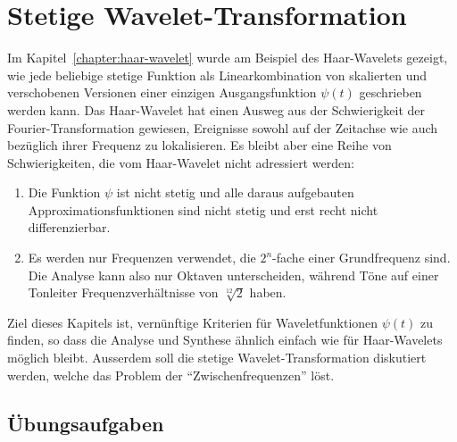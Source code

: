 %
%
%
\chapter{Stetige Wavelet-Transformation
\label{chapter:cwt}}
Im Kapitel~\ref{chapter:haar-wavelet} wurde am Beispiel des Haar-Wavelets
gezeigt, wie jede beliebige stetige Funktion als Linearkombination 
von skalierten und verschobenen Versionen einer einzigen Ausgangsfunktion
$\psi(t)$ geschrieben werden kann.
Das Haar-Wavelet hat einen Ausweg aus der Schwierigkeit der
Fourier-Transformation gewiesen, Ereignisse sowohl auf der Zeitachse
wie auch bezüglich ihrer Frequenz zu lokalisieren.
Es bleibt aber eine Reihe von Schwierigkeiten, die vom Haar-Wavelet nicht
adressiert werden:
\begin{enumerate}
\item
Die Funktion $\psi$ ist nicht stetig und alle daraus aufgebauten
Approximationsfunktionen sind nicht stetig
und erst recht nicht differenzierbar.
\item
Es werden nur Frequenzen verwendet, die $2^n$-fache einer Grundfrequenz
sind.
Die Analyse kann also nur Oktaven unterscheiden, während
%
Töne auf einer Tonleiter Frequenzverhältnisse von $\sqrt[12]{2}$ haben.
%
\end{enumerate}
Ziel dieses Kapitels ist, vernünftige Kriterien für Waveletfunktionen
$\psi(t)$ zu finden, so dass die Analyse und Synthese ähnlich einfach
wie für Haar-Wavelets möglich bleibt.
Ausserdem soll die stetige Wavelet-Transformation diskutiert werden,
welche das Problem der ``Zwischenfrequenzen'' löst.
%






\section*{Übungsaufgaben}

